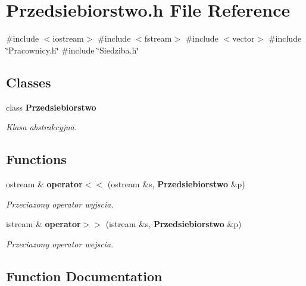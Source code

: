 \section{Przedsiebiorstwo.\+h File Reference}
\label{_przedsiebiorstwo_8h}
{\ttfamily \#include $<$iostream$>$}\newline
{\ttfamily \#include $<$fstream$>$}\newline
{\ttfamily \#include $<$vector$>$}\newline
{\ttfamily \#include \char`\"{}Pracownicy.\+h\char`\"{}}\newline
{\ttfamily \#include \char`\"{}Siedziba.\+h\char`\"{}}\newline
\subsection*{Classes}
\begin{DoxyCompactItemize}
\item 
class \textbf{ Przedsiebiorstwo}
\begin{DoxyCompactList}\small\item\em Klasa abstrakcyjna. \end{DoxyCompactList}\end{DoxyCompactItemize}
\subsection*{Functions}
\begin{DoxyCompactItemize}
\item 
ostream \& \textbf{ operator$<$$<$} (ostream \&s, \textbf{ Przedsiebiorstwo} \&p)
\begin{DoxyCompactList}\small\item\em Przeciazony operator wyjscia. \end{DoxyCompactList}\item 
istream \& \textbf{ operator$>$$>$} (istream \&s, \textbf{ Przedsiebiorstwo} \&p)
\begin{DoxyCompactList}\small\item\em Przeciazony operator wejscia. \end{DoxyCompactList}\end{DoxyCompactItemize}


\subsection{Function Documentation}
\mbox{\label{_przedsiebiorstwo_8h_a1c4af9010b5f2325f11a349a702c78ef}} 
